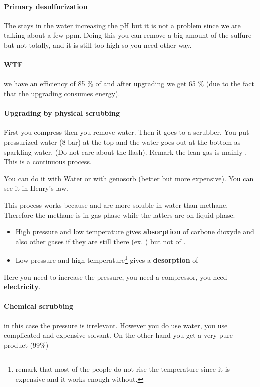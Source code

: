\documentclass[10pt,a4paper]{article}
\begin{document}
\paragraph{Primary desulfurization}  The  stays in the water increasing the pH but it is not a problem since we are talking about a few ppm. Doing this you can remove a big amount of the sulfure but not totally, and it is still too high so you need other way.
\paragraph{WTF} we have an efficiency of 85 \% of  and after upgrading we get 65 \% (due to the fact that the upgrading consumes energy).

\paragraph{Upgrading by physical scrubbing} First you compress then you remove water. Then it goes to a scrubber. You put pressurized water (8 bar) at the top and the water goes out at the bottom as sparkling water. (Do not care about the flash). Remark the lean gas is mainly . This is a continuous process.

You can do it with Water or with genosorb (better but more expensive). You can see it in Henry's law.

This process works because  and  are more soluble in water than methane. Therefore the methane is in gas phase while the latters are on liquid phase.

\begin{itemize}

\item High pressure and low temperature gives \textbf{absorption} of carbone dioxyde and also other gases if they are still there (ex. ) but not of .
\item Low pressure and high temperature\footnote{remark that most of the people do not rise the temperature since it is expensive and it works enough without.} gives a \textbf{desorption} of 
\end{itemize}

Here you need to increase the pressure, you need a compressor, you need \textbf{electricity}.

\paragraph{Chemical scrubbing} in this case the pressure is irrelevant. However you do use water, you use complicated and expensive solvant. On the other hand you get a very pure product (99\%)
\end{document}
